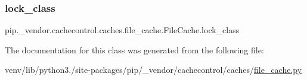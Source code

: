 \subsubsection{\texorpdfstring{lock\+\_\+class}{lock\_class}}
{\footnotesize\ttfamily pip.\+\_\+vendor.\+cachecontrol.\+caches.\+file\+\_\+cache.\+File\+Cache.\+lock\+\_\+class}



The documentation for this class was generated from the following file\+:\begin{DoxyCompactItemize}
\item 
venv/lib/python3./site-\/packages/pip/\+\_\+vendor/cachecontrol/caches/\hyperlink{file__cache_8py}{file\+\_\+cache.\+py}\end{DoxyCompactItemize}
